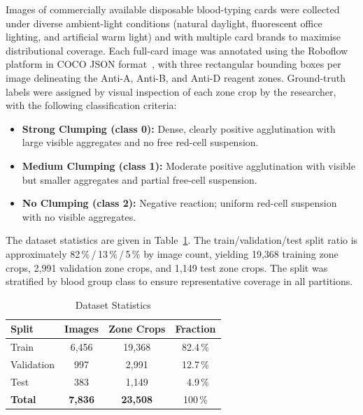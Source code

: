 \documentclass[journal]{IEEEtran}
\begin{document}
Images of commercially available disposable blood-typing cards were
collected under diverse ambient-light conditions (natural daylight,
fluorescent office lighting, and artificial warm light) and with
multiple card brands to maximise distributional coverage.
Each full-card image was annotated using the Roboflow platform in
COCO JSON format~\cite{lin2014coco}, with three rectangular bounding
boxes per image delineating the Anti-A, Anti-B, and Anti-D reagent
zones.
Ground-truth labels were assigned by visual inspection of each
zone crop by the researcher, with the following classification
criteria:
\begin{itemize}
  \item \textbf{Strong Clumping (class 0):} Dense, clearly positive
        agglutination with large visible aggregates and no free
        red-cell suspension.
  \item \textbf{Medium Clumping (class 1):} Moderate positive
        agglutination with visible but smaller aggregates and
        partial free-cell suspension.
  \item \textbf{No Clumping (class 2):} Negative reaction; uniform
        red-cell suspension with no visible aggregates.
\end{itemize}

The dataset statistics are given in Table~\ref{tab:dataset}.
The train/validation/test split ratio is approximately 82\,\%\,/\,13\,\%\,/\,5\,\%
by image count, yielding 19,368 training zone crops, 2,991
validation zone crops, and 1,149 test zone crops.
The split was stratified by blood group class to ensure representative
coverage in all partitions.

\begin{table}[htbp]
  \caption{Dataset Statistics}
  \label{tab:dataset}
  \centering
  \renewcommand{\arraystretch}{1.1}
  \begin{tabular}{lccc}
    \toprule
    \textbf{Split} & \textbf{Images} & \textbf{Zone Crops} & \textbf{Fraction} \\
    \midrule
    Train      & 6,456 & 19,368 & 82.4\,\% \\
    Validation & 997   & 2,991  & 12.7\,\% \\
    Test       & 383   & 1,149  & ~4.9\,\% \\
    \midrule
    \textbf{Total} & \textbf{7,836} & \textbf{23,508} & 100\,\% \\
    \bottomrule
  \end{tabular}
\end{table}
\end{document}
